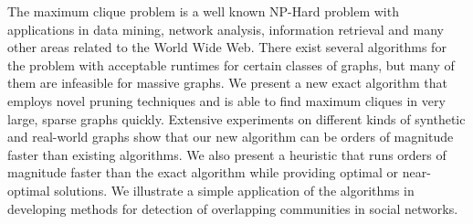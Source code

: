 The maximum clique problem is a well known NP-Hard problem with
applications in data mining, network analysis, information retrieval and many other
areas related to the World Wide Web.
There exist several algorithms for the problem with acceptable runtimes for
certain classes of graphs, but many of them are infeasible for massive graphs. 
We present a new exact algorithm that employs novel pruning techniques and 
is able to find maximum cliques in very large, sparse graphs quickly. 
Extensive experiments on different kinds of synthetic and 
real-world graphs show that our new algorithm can be orders of magnitude 
faster than existing algorithms.
We also present a heuristic that runs orders of magnitude faster than 
the exact algorithm while providing optimal or near-optimal solutions.
We illustrate a simple application of the algorithms in developing methods for
detection of overlapping communities in social networks.

